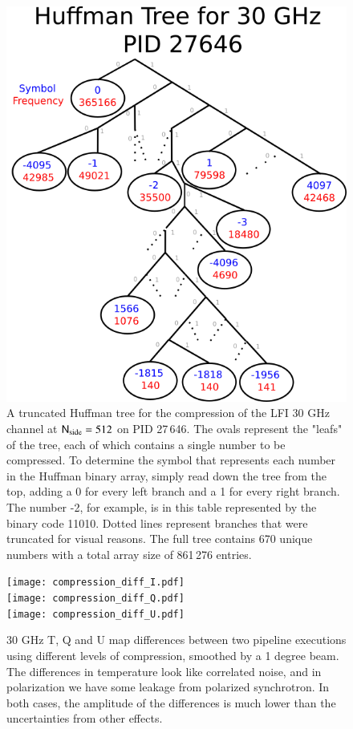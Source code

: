 \documentclass[twocolumn]{aa}
\newcommand{\N}[0]{\tens{N}}
\begin{document}
\begin{figure}[t]
  \center
  \includegraphics[width=\linewidth]{huff_tree.png}
  \caption{A truncated Huffman tree for the compression of the LFI 30 GHz channel at $\N_{\mathrm{side}}=512$ on PID 27\,646. The ovals represent the "leafs" of the tree, each of which contains a single number to be compressed. To determine the symbol that represents each number in the Huffman binary array, simply read down the tree from the top, adding a 0 for every left branch and a 1 for every right branch. The number -2, for example, is in this table represented by the binary code 11010. Dotted lines represent branches that were truncated for visual reasons. The full tree contains 670 unique numbers with a total array size of 861\,276 entries.
  }\label{fig:huffman}
\end{figure}

\begin{figure}[t]
  \center
  \texttt{[image: compression\_diff\_I.pdf]}\\
  \texttt{[image: compression\_diff\_Q.pdf]}\\
  \texttt{[image: compression\_diff\_U.pdf]}
  \caption{30 GHz T, Q and U map differences between two pipeline executions using different levels of compression, smoothed by a 1 degree beam. The differences in temperature look like correlated noise, and in polarization we have some leakage from polarized synchrotron. In both cases, the amplitude of the differences is much lower than the uncertainties from other effects. 
  }\label{fig:compressiondiff}
\end{figure}
\end{document}
